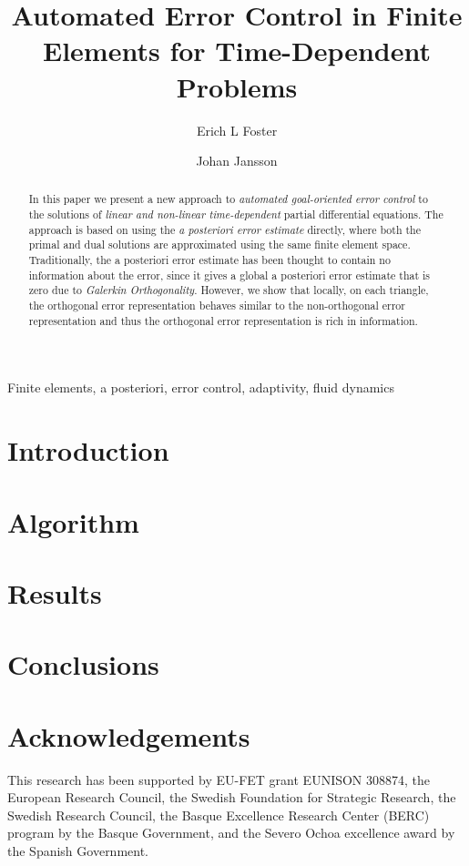 \documentclass[a4paper]{article}
\author[1]{Erich L Foster}
\author[1,2]{Johan Jansson}
\affil[1]{Basque Center for Applied Mathematics, Bilbao, Basque Country -- Spain}
\affil[2]{CSC, KTH Royal Institute of Technology, Stockholm, Sweden}
\title{Automated Error Control in Finite Elements for Time-Dependent Problems}
\begin{document}
  \maketitle
  \tableofcontents
  \begin{abstract}
    In this paper we present a new approach to \emph{automated goal-oriented
    error control} to the solutions of \emph{linear and non-linear
    time-dependent} partial differential equations. The approach is based on
    using the \emph{a posteriori error estimate} directly, where both the primal
    and dual solutions are approximated using the same finite element space.
    Traditionally, the a posteriori error estimate has been thought to contain
    no information about the error, since it gives a global a posteriori error
    estimate that is zero due to \emph{Galerkin Orthogonality}. However, we show
    that locally, on each triangle, the orthogonal error representation behaves
    similar to the non-orthogonal error representation and thus the orthogonal
    error representation is rich in information.
  \end{abstract}
  \begin{keywords}
    Finite elements, a posteriori, error control, adaptivity, fluid dynamics
  \end{keywords}

  \section{Introduction} \label{sec:Intro}
  

  \section{Algorithm} \label{sec:Algorithm}
  

  \section{Results} \label{sec:Results}
  

  \section{Conclusions} \label{sec:Conclusions}
  

  \section*{Acknowledgements}
  This research has been supported by EU-FET grant EUNISON 308874, the European
  Research Council, the Swedish Foundation for Strategic Research, the Swedish
  Research Council, the Basque Excellence Research Center (BERC) program by
  the Basque Government, and the Severo Ochoa excellence award by the Spanish
  Government.

  \printbibliography
\end{document}
